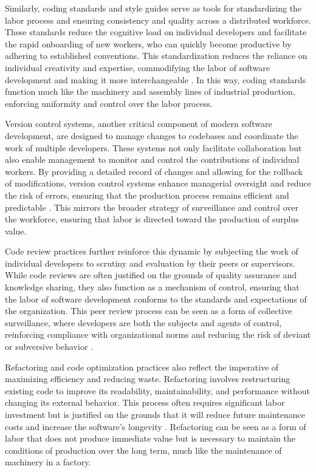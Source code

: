 \begin{refsection}
Similarly, coding standards and style guides serve as tools for standardizing the labor process and ensuring consistency and quality across a distributed workforce. These standards reduce the cognitive load on individual developers and facilitate the rapid onboarding of new workers, who can quickly become productive by adhering to established conventions. This standardization reduces the reliance on individual creativity and expertise, commodifying the labor of software development and making it more interchangeable \cite[pp.~85-88]{Pressman2019}. In this way, coding standards function much like the machinery and assembly lines of industrial production, enforcing uniformity and control over the labor process.

Version control systems, another critical component of modern software development, are designed to manage changes to codebases and coordinate the work of multiple developers. These systems not only facilitate collaboration but also enable management to monitor and control the contributions of individual workers. By providing a detailed record of changes and allowing for the rollback of modifications, version control systems enhance managerial oversight and reduce the risk of errors, ensuring that the production process remains efficient and predictable \cite[pp.~150-153]{Bass2021}. This mirrors the broader strategy of surveillance and control over the workforce, ensuring that labor is directed toward the production of surplus value.

Code review practices further reinforce this dynamic by subjecting the work of individual developers to scrutiny and evaluation by their peers or supervisors. While code reviews are often justified on the grounds of quality assurance and knowledge sharing, they also function as a mechanism of control, ensuring that the labor of software development conforms to the standards and expectations of the organization. This peer review process can be seen as a form of collective surveillance, where developers are both the subjects and agents of control, reinforcing compliance with organizational norms and reducing the risk of deviant or subversive behavior \cite[pp.~95-97]{Fowler2015}.

Refactoring and code optimization practices also reflect the imperative of maximizing efficiency and reducing waste. Refactoring involves restructuring existing code to improve its readability, maintainability, and performance without changing its external behavior. This process often requires significant labor investment but is justified on the grounds that it will reduce future maintenance costs and increase the software’s longevity \cite[pp.~110-113]{Larman2008}. Refactoring can be seen as a form of labor that does not produce immediate value but is necessary to maintain the conditions of production over the long term, much like the maintenance of machinery in a factory.


\end{refsection}
